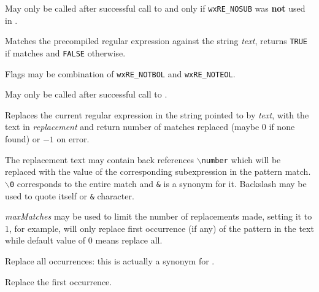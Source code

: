 May only be called after successful call to  
and only if {\tt wxRE\_NOSUB} was {\bf not} used in 
.

\label{wxregexmatches}


Matches the precompiled regular expression against the string {\it text},
returns {\tt TRUE} if matches and {\tt FALSE} otherwise.

Flags may be combination of {\tt wxRE\_NOTBOL} and {\tt wxRE\_NOTEOL}.

May only be called after successful call to .

\label{wxregexreplace}


Replaces the current regular expression in the string pointed to by
{\it text}, with the text in {\it replacement} and return number of matches
replaced (maybe $0$ if none found) or $-1$ on error.

The replacement text may contain back references {\tt $\backslash$number} which will be
replaced with the value of the corresponding subexpression in the
pattern match. {\tt $\backslash$0} corresponds to the entire match and {\tt \&} is a
synonym for it. Backslash may be used to quote itself or {\tt \&} character.

{\it maxMatches} may be used to limit the number of replacements made, setting
it to $1$, for example, will only replace first occurrence (if any) of the
pattern in the text while default value of $0$ means replace all.

\label{wxregexreplaceall}


Replace all occurrences: this is actually a synonym for 
.



\label{wxregexreplacefirst}


Replace the first occurrence.



